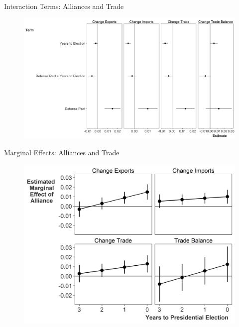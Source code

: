 \documentclass[12pt]{beamer}
\begin{document}
\begin{frame}{Interaction Terms: Alliances and Trade}

\begin{figure}[htbp]
	\centering
		\includegraphics[width=.90\textwidth]{trade-inter-terms.png}
\end{figure}


\end{frame}



\begin{frame}{Marginal Effects: Alliances and Trade}

\begin{figure}[htbp]
	\centering
		\includegraphics[height=.90\textheight]{us-defense-me.png}
\end{figure}


\end{frame}
\end{document}
